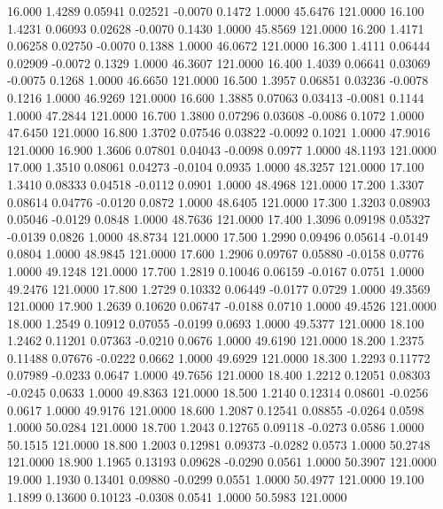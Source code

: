   16.000   1.4289   0.05941   0.02521  -0.0070   0.1472   1.0000  45.6476 121.0000
  16.100   1.4231   0.06093   0.02628  -0.0070   0.1430   1.0000  45.8569 121.0000
  16.200   1.4171   0.06258   0.02750  -0.0070   0.1388   1.0000  46.0672 121.0000
  16.300   1.4111   0.06444   0.02909  -0.0072   0.1329   1.0000  46.3607 121.0000
  16.400   1.4039   0.06641   0.03069  -0.0075   0.1268   1.0000  46.6650 121.0000
  16.500   1.3957   0.06851   0.03236  -0.0078   0.1216   1.0000  46.9269 121.0000
  16.600   1.3885   0.07063   0.03413  -0.0081   0.1144   1.0000  47.2844 121.0000
  16.700   1.3800   0.07296   0.03608  -0.0086   0.1072   1.0000  47.6450 121.0000
  16.800   1.3702   0.07546   0.03822  -0.0092   0.1021   1.0000  47.9016 121.0000
  16.900   1.3606   0.07801   0.04043  -0.0098   0.0977   1.0000  48.1193 121.0000
  17.000   1.3510   0.08061   0.04273  -0.0104   0.0935   1.0000  48.3257 121.0000
  17.100   1.3410   0.08333   0.04518  -0.0112   0.0901   1.0000  48.4968 121.0000
  17.200   1.3307   0.08614   0.04776  -0.0120   0.0872   1.0000  48.6405 121.0000
  17.300   1.3203   0.08903   0.05046  -0.0129   0.0848   1.0000  48.7636 121.0000
  17.400   1.3096   0.09198   0.05327  -0.0139   0.0826   1.0000  48.8734 121.0000
  17.500   1.2990   0.09496   0.05614  -0.0149   0.0804   1.0000  48.9845 121.0000
  17.600   1.2906   0.09767   0.05880  -0.0158   0.0776   1.0000  49.1248 121.0000
  17.700   1.2819   0.10046   0.06159  -0.0167   0.0751   1.0000  49.2476 121.0000
  17.800   1.2729   0.10332   0.06449  -0.0177   0.0729   1.0000  49.3569 121.0000
  17.900   1.2639   0.10620   0.06747  -0.0188   0.0710   1.0000  49.4526 121.0000
  18.000   1.2549   0.10912   0.07055  -0.0199   0.0693   1.0000  49.5377 121.0000
  18.100   1.2462   0.11201   0.07363  -0.0210   0.0676   1.0000  49.6190 121.0000
  18.200   1.2375   0.11488   0.07676  -0.0222   0.0662   1.0000  49.6929 121.0000
  18.300   1.2293   0.11772   0.07989  -0.0233   0.0647   1.0000  49.7656 121.0000
  18.400   1.2212   0.12051   0.08303  -0.0245   0.0633   1.0000  49.8363 121.0000
  18.500   1.2140   0.12314   0.08601  -0.0256   0.0617   1.0000  49.9176 121.0000
  18.600   1.2087   0.12541   0.08855  -0.0264   0.0598   1.0000  50.0284 121.0000
  18.700   1.2043   0.12765   0.09118  -0.0273   0.0586   1.0000  50.1515 121.0000
  18.800   1.2003   0.12981   0.09373  -0.0282   0.0573   1.0000  50.2748 121.0000
  18.900   1.1965   0.13193   0.09628  -0.0290   0.0561   1.0000  50.3907 121.0000
  19.000   1.1930   0.13401   0.09880  -0.0299   0.0551   1.0000  50.4977 121.0000
  19.100   1.1899   0.13600   0.10123  -0.0308   0.0541   1.0000  50.5983 121.0000
